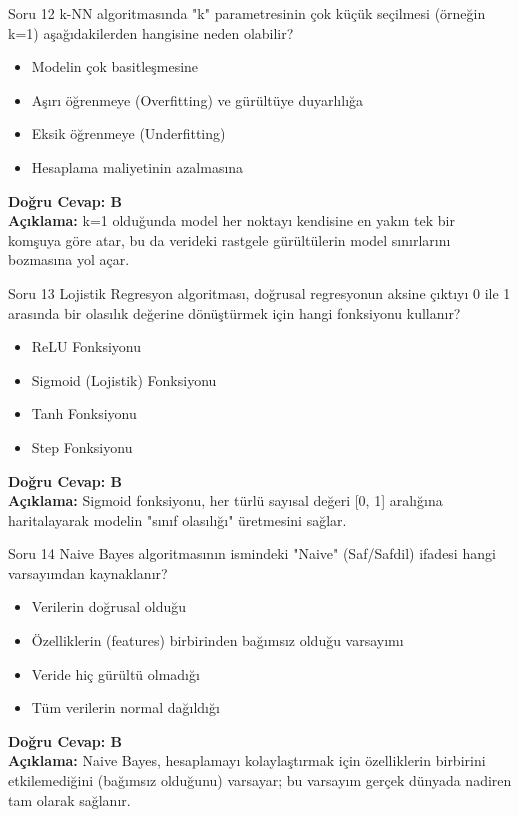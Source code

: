\documentclass[12pt,a4paper]{article}
\begin{document}
\begin{testcard}{Soru 12}
    k-NN algoritmasında "k" parametresinin çok küçük seçilmesi (örneğin k=1) aşağıdakilerden hangisine neden olabilir?
    \begin{itemize}
        \item[A)] Modelin çok basitleşmesine
        \item[B)] Aşırı öğrenmeye (Overfitting) ve gürültüye duyarlılığa
        \item[C)] Eksik öğrenmeye (Underfitting)
        \item[D)] Hesaplama maliyetinin azalmasına
    \end{itemize}
    \tcblower
    \textbf{Doğru Cevap: B} \\
    \textbf{Açıklama:} k=1 olduğunda model her noktayı kendisine en yakın tek bir komşuya göre atar, bu da verideki rastgele gürültülerin model sınırlarını bozmasına yol açar.
\end{testcard}

\begin{testcard}{Soru 13}
    Lojistik Regresyon algoritması, doğrusal regresyonun aksine çıktıyı 0 ile 1 arasında bir olasılık değerine dönüştürmek için hangi fonksiyonu kullanır?
    \begin{itemize}
        \item[A)] ReLU Fonksiyonu
        \item[B)] Sigmoid (Lojistik) Fonksiyonu
        \item[C)] Tanh Fonksiyonu
        \item[D)] Step Fonksiyonu
    \end{itemize}
    \tcblower
    \textbf{Doğru Cevap: B} \\
    \textbf{Açıklama:} Sigmoid fonksiyonu, her türlü sayısal değeri [0, 1] aralığına haritalayarak modelin "sınıf olasılığı" üretmesini sağlar.
\end{testcard}

\begin{testcard}{Soru 14}
    Naive Bayes algoritmasının ismindeki "Naive" (Saf/Safdil) ifadesi hangi varsayımdan kaynaklanır?
    \begin{itemize}
        \item[A)] Verilerin doğrusal olduğu
        \item[B)] Özelliklerin (features) birbirinden bağımsız olduğu varsayımı
        \item[C)] Veride hiç gürültü olmadığı
        \item[D)] Tüm verilerin normal dağıldığı
    \end{itemize}
    \tcblower
    \textbf{Doğru Cevap: B} \\
    \textbf{Açıklama:} Naive Bayes, hesaplamayı kolaylaştırmak için özelliklerin birbirini etkilemediğini (bağımsız olduğunu) varsayar; bu varsayım gerçek dünyada nadiren tam olarak sağlanır.
\end{testcard}
\end{document}

